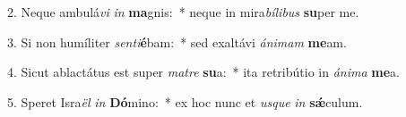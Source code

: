 2. Neque ambulá\textit{vi} \textit{in} \textbf{ma}gnis:~*  neque in mira\textit{bí}\textit{li}\textit{bus} \textbf{su}per me.\

3. Si non humíliter \textit{sen}\textit{ti}\textbf{é}bam:~*  sed exaltávi \textit{á}\textit{ni}\textit{mam} \textbf{me}am.\

4. Sicut ablactátus est super \textit{ma}\textit{tre} \textbf{su}a:~*  ita retribútio in \textit{á}\textit{ni}\textit{ma} \textbf{me}a.\

5. Speret Isra\textit{ël} \textit{in} \textbf{Dó}mino:~*  ex hoc nunc et \textit{us}\textit{que} \textit{in} \textbf{sǽ}culum.\

